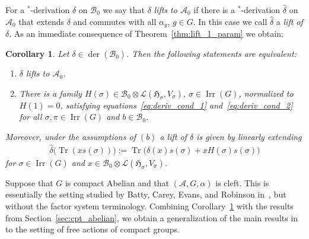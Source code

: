 \documentclass[10pt,a4paper]{amsart}
\numberwithin{equation}{section}
\newtheorem{Corollary}[Theorem]{Corollary}
\newcommand*{\tensor}{\otimes}		%
\DeclareMathOperator{\Tr}{Tr}		%
\DeclareMathOperator{\der}{der}
\newcommand*{\Star}{$^*$\nobreakdash}
\newcommand*{\hilb}{\mathfrak}		%
\newcommand*{\alg}{\mathcal}		%
\newcommand*{\hH}{\hilb{H}}			%
\newcommand*{\aA}{\alg{A}}			%
\newcommand*{\aB}{\alg{B}} 			%
\newcommand*{\End}{\mathcal{L}} %
\DeclareMathOperator{\Irrep}{Irr} 			%
\begin{document}
For a \Star-derivation $\delta$ on $\aB_0$ we say that $\delta$ \emph{lifts to $\aA_0$} if there is a \Star-derivation $\hat \delta$ on $\aA_0$ that extends $\delta$ and commutes with all $\alpha_g$, $g \in G$.
In this case we call $\hat \delta$ a \emph{lift of $\delta$}.
As an immediate consequence of Theorem~\ref{thm:lift_1_param} we obtain:
\begin{Corollary}\label{cor:liftder}
	Let $\delta \in \der(\aB_0)$.
	Then the following statements are equivalent:
\begin{enumerate}\itemsep=0pt
\item[$(a)$]
			$\delta$ lifts to $\aA_0$.
\item[$(b)$] %
There is a family $H(\sigma) \in \aB_0 \tensor \End(\hH_\sigma, V_\sigma)$, $\sigma \in \Irrep(G)$, normalized to $H(1)= 0$, satisfying equations~\eqref{eq:deriv_cond_1} and~\eqref{eq:deriv_cond_2} for all $\sigma, \pi \in \Irrep(G)$ and $b \in \aB_0$.
	\end{enumerate}
	Moreover, under the assumptions of $(b)$ a lift of $\delta$ is given by linearly extending
	\begin{gather*}
		\hat \delta\bigl( \Tr ( xs(\sigma) ) \bigr) := \Tr\bigl( \delta(x)s(\sigma) + x H(\sigma) s(\sigma) \bigr)
	\end{gather*}
	for $\sigma \in \Irrep(G)$ and $x \in \aB_0 \tensor \End(\hH_\sigma,V_\sigma)$.
\end{Corollary}

\begin{Remark}\label{rem:cleftAbelian}
Suppose that $G$ is compact Abelian and that $(\aA,G,\alpha)$ is cleft.
This is essentially the setting studied by Batty, Carey, Evans, and Robinson in~\cite{BCER84}, but without the factor system terminology.
Combining Corollary~\ref{cor:liftder} with the results from Section~\ref{sec:cpt_abelian}, we obtain a generalization of the main results in~\cite{BCER84} to the setting of free actions of compact groups.
\end{Remark}
\end{document}
